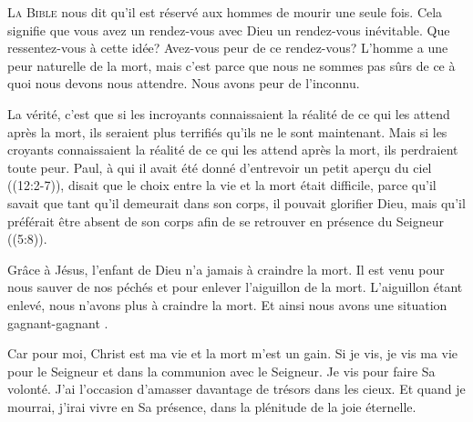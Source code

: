 \dvrule







\lettrine{L}{a Bible} nous dit
 qu'il est réservé aux hommes de mourir une seule fois.
 Cela signifie que vous avez un rendez-vous avec Dieu
 \ocadr un rendez-vous inévitable. Que ressentez-vous à cette idée?
 Avez-vous peur de ce rendez-vous? L'homme a une peur naturelle de la mort,
 mais c'est parce que nous ne sommes pas sûrs de ce à quoi
 nous devons nous attendre. Nous avons peur de l'inconnu.


La vérité, c'est que si les incroyants connaissaient la réalité
 de ce qui les attend après la mort, ils seraient plus terrifiés
 qu'ils ne le sont maintenant. Mais si les croyants connaissaient
 la réalité de ce qui les attend après la mort, ils perdraient toute peur.
 Paul, à qui il avait été donné d'entrevoir un petit aper\c{c}u du ciel
 ((12:2-7)), disait que le choix entre la vie et la mort
 était difficile, parce qu'il savait que tant qu'il demeurait dans son corps,
 il pouvait glorifier Dieu, mais qu'il préférait être absent de son corps
 afin de se retrouver en présence du Seigneur ((5:8)).

Grâce à Jésus, l'enfant de Dieu n'a jamais à craindre la mort.
 Il est venu pour nous sauver de nos péchés et pour enlever l'aiguillon
 de la mort. L'aiguillon étant enlevé, nous n'avons plus à craindre la mort.
 Et ainsi nous avons une situation \Og gagnant-gagnant \Fg{}.

\Og Car pour moi, Christ est ma vie et la mort m'est un gain. \Fg{}
 Si je vis, je vis ma vie pour le Seigneur et dans la communion
 avec le Seigneur. Je vis pour faire Sa volonté.
 J'ai l'occasion d'amasser davantage de trésors dans les cieux.
 Et quand je mourrai, j'irai vivre en Sa présence,
 dans la plénitude de la joie éternelle.

